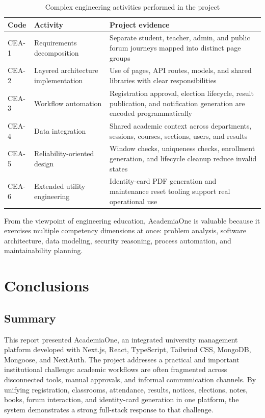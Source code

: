 \documentclass[12pt,a4paper]{report}
\newcommand{\systemName}{AcademiaOne}
\begin{document}
\begin{table}[H]
  \centering
  \caption{Complex engineering activities performed in the project}
  \label{tab:complex-activities}
  \renewcommand{\arraystretch}{1.2}
  \begin{tabularx}{\textwidth}{p{1.1in}p{2.0in}Y}
    \toprule
    \textbf{Code} & \textbf{Activity} & \textbf{Project evidence} \\
    \midrule
    CEA-1 & Requirements decomposition & Separate student, teacher, admin, and public forum journeys mapped into distinct page groups \\
    CEA-2 & Layered architecture implementation & Use of pages, API routes, models, and shared libraries with clear responsibilities \\
    CEA-3 & Workflow automation & Registration approval, election lifecycle, result publication, and notification generation are encoded programmatically \\
    CEA-4 & Data integration & Shared academic context across departments, sessions, courses, sections, users, and results \\
    CEA-5 & Reliability-oriented design & Window checks, uniqueness checks, enrollment generation, and lifecycle cleanup reduce invalid states \\
    CEA-6 & Extended utility engineering & Identity-card PDF generation and maintenance reset tooling support real operational use \\
    \bottomrule
  \end{tabularx}
\end{table}

From the viewpoint of engineering education, \systemName{} is valuable because it exercises multiple competency dimensions at once: problem analysis, software architecture, data modeling, security reasoning, process automation, and maintainability planning.

\chapter{Conclusions}

\section{Summary}
This report presented \systemName{}, an integrated university management platform developed with Next.js, React, TypeScript, Tailwind CSS, MongoDB, Mongoose, and NextAuth. The project addresses a practical and important institutional challenge: academic workflows are often fragmented across disconnected tools, manual approvals, and informal communication channels. By unifying registration, classrooms, attendance, results, notices, elections, notes, books, forum interaction, and identity-card generation in one platform, the system demonstrates a strong full-stack response to that challenge.
\end{document}
